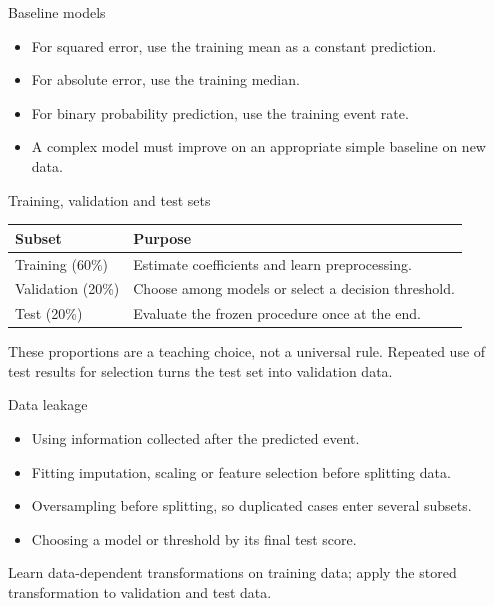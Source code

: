 \begin{frame}{Baseline models}
\begin{itemize}
\item For squared error, use the training mean as a constant prediction.
\item For absolute error, use the training median.
\item For binary probability prediction, use the training event rate.
\item A complex model must improve on an appropriate simple baseline on new data.
\end{itemize}
\end{frame}

\begin{frame}{Training, validation and test sets}
\begin{center}\begin{tabular}{lp{}}\toprule
Subset & Purpose\\\midrule Training (60\%) & Estimate coefficients and learn preprocessing.\\ Validation (20\%) & Choose among models or select a decision threshold.\\ Test (20\%) & Evaluate the frozen procedure once at the end.\\
\bottomrule\end{tabular}\end{center}These proportions are a teaching choice, not a universal rule. Repeated use of test results for selection turns the test set into validation data.
\end{frame}

\begin{frame}{Data leakage}
\begin{itemize}
\item Using information collected after the predicted event.
\item Fitting imputation, scaling or feature selection before splitting data.
\item Oversampling before splitting, so duplicated cases enter several subsets.
\item Choosing a model or threshold by its final test score.
\end{itemize}Learn data-dependent transformations on training data; apply the stored transformation to validation and test data.
\end{frame}

